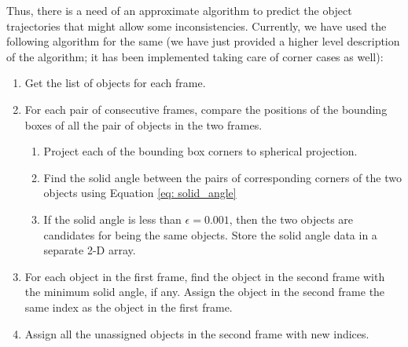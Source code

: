 Thus, there is a need of an approximate algorithm to predict the object trajectories that might allow some inconsistencies. Currently, we have used the following algorithm for the same (we have just provided a higher level description of the algorithm; it has been implemented taking care of corner cases as well):
\begin{enumerate}
    \item Get the list of objects for each frame.
    \item For each pair of consecutive frames, compare the positions of the bounding boxes of all the pair of objects in the two frames.
    \begin{enumerate}[label=(\alph*)]
        \item Project each of the bounding box corners to spherical projection.
        \item Find the solid angle between the pairs of corresponding corners of the two objects using Equation \ref{eq: solid_angle}
        \item If the solid angle is less than \(\epsilon = 0.001\), then the two objects are candidates for being the same objects. Store the solid angle data in a separate 2-D array.
    \end{enumerate}
    \item For each object in the first frame, find the object in the second frame with the minimum solid angle, if any. Assign the object in the second frame the same index as the object in the first frame.
    \item Assign all the unassigned objects in the second frame with new indices.
\end{enumerate}


